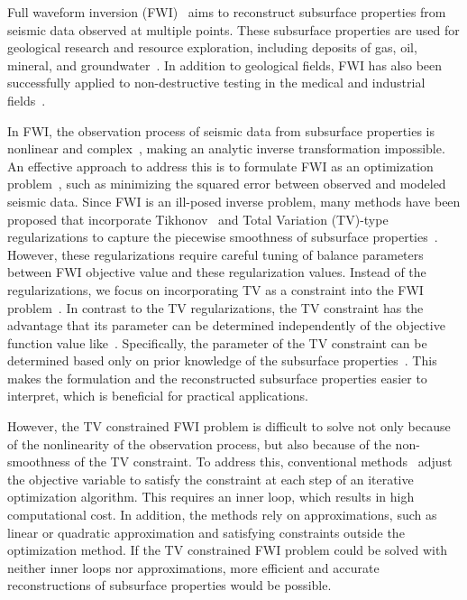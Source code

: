 Full waveform inversion (FWI)~\cite{FWI0,FWI1} aims to reconstruct subsurface properties from seismic data observed at multiple points.
These subsurface properties are used for geological research and resource exploration, including deposits of gas, oil, mineral, and groundwater~\cite{FWI1,FWIApplicationGroundwater0,FWIApplicationGroundwater1}.
In addition to geological fields, FWI has also been successfully applied to non-destructive testing in the medical and industrial fields~\cite{FWIApplicationNonDestructiveTesting0,FWIApplicationNonDestructiveTesting1}.

In FWI, the observation process of seismic data from subsurface properties is nonlinear and complex~\cite{FWI1}, making an analytic inverse transformation impossible.
An effective approach to address this is to formulate FWI as an optimization problem~\cite{FWI0,CustomFWI0,CustomFWI1,CustomFWI2,CustomFWI3,CustomFWI4,CustomFWI5}, such as minimizing the squared error between observed and modeled seismic data.
Since FWI is an ill-posed inverse problem, many methods have been proposed that incorporate Tikhonov~\cite{tikhonov} and Total Variation (TV)-type~\cite{TV,TGV} regularizations to capture the piecewise smoothness of subsurface properties~\cite{FWI-with-tikhonov-regularization,FWI-with-TV-regularization,FWI-with-directional-TV-regularization,FWI-with-high-order-TV-regularization,FWI-with-TGV-regularization}.
However, these regularizations require careful tuning of balance parameters between FWI objective value and these regularization values.
Instead of the regularizations, we focus on incorporating TV as a constraint into the FWI problem~\cite{FWI-with-TV-constraint,FWI-with-TV-constraint2,FWI-with-TV-constraint3,FWI-with-TV-constraint4}.
In contrast to the TV regularizations, the TV constraint has the advantage that its parameter can be determined independently of the objective function value like~\cite{constraint0,constraint1,constraint2,constraint3,constraint4}.
Specifically, the parameter of the TV constraint can be determined based only on prior knowledge of the subsurface properties~\cite{constraints-vs-penalties-in-FWI}.
This makes the formulation and the reconstructed subsurface properties easier to interpret, which is beneficial for practical applications.

However, the TV constrained FWI problem is difficult to solve not only because of the nonlinearity of the observation process, but also because of the non-smoothness of the TV constraint.
To address this, conventional methods~\mbox{\cite{FWI-with-TV-constraint,FWI-with-TV-constraint2,FWI-with-TV-constraint3,FWI-with-TV-constraint4}} adjust the objective variable to satisfy the constraint at each step of an iterative optimization algorithm.
This requires an inner loop, which results in high computational cost.
In addition, the methods rely on approximations, such as linear or quadratic approximation and satisfying constraints outside the optimization method.
If the TV constrained FWI problem could be solved with neither inner loops nor approximations, more efficient and accurate reconstructions of subsurface properties would be possible.

